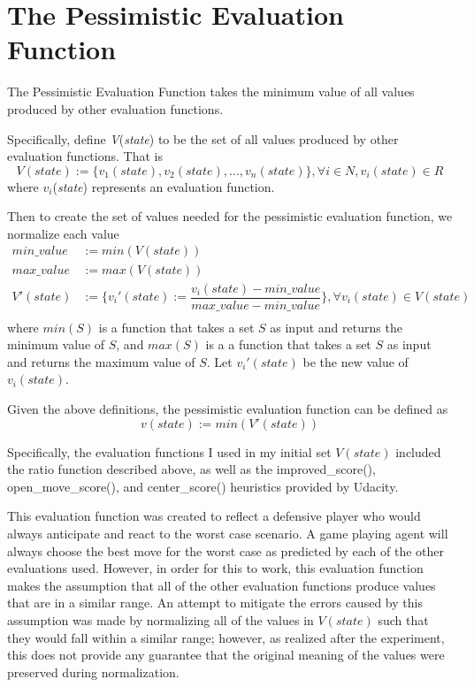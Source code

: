 \documentclass[12pt]{article}
\begin{document}
\section{The Pessimistic Evaluation Function}
The Pessimistic Evaluation Function takes the minimum value of all values produced by other evaluation functions.

Specifically, define \textit{V}(\textit{state}) to be the set of all values produced by other evaluation functions. That is
\begin{equation*}
V(state) := \{v_1(state), v_2(state), ..., v_n(state)\}, \forall i \in N, v_i(state) \in R
\end{equation*} where $v_i$(\textit{state}) represents an evaluation function.

Then to create the set of values needed for the pessimistic evaluation function, we normalize each value 
\begin{equation*}
	\begin{split}
		min\_value &:= min(V(state))\\
		max\_value &:= max(V(state))\\
		V'(state) &:= \{v_i'(state) := \dfrac{v_i(state) - min\_value}{max\_value - min\_value}\}, \forall v_i(state) \in V(state)\\
	\end{split}
\end{equation*}
where $min(S)$ is a function that takes a set $S$ as input and returns the minimum value of $S$, and $max(S)$ is a a function that takes a set $S$ as input and returns the maximum value of $S$. Let $v_i'(state)$ be the new value of $v_i(state)$.

Given the above definitions, the pessimistic evaluation function can be defined as
\begin{equation*}
v(state) := min(V'(state))
\end{equation*}

Specifically, the evaluation functions I used in my initial set $V(state)$ included the ratio function described above, as well as the improved\_score(), open\_move\_score(), and center\_score() heuristics provided by Udacity.

This evaluation function was created to reflect a defensive player who would always anticipate and react to the worst case scenario. A game playing agent will always choose the best move for the worst case as predicted by each of the other evaluations used. However, in order for this to work, this evaluation function makes the assumption that all of the other evaluation functions produce values that are in a similar range. An attempt to mitigate the errors caused by this assumption was made by normalizing all of the values in $V(state)$ such that they would fall within a similar range; however, as realized after the experiment, this does not provide any guarantee that the original meaning of the values were preserved during normalization.
\end{document}
